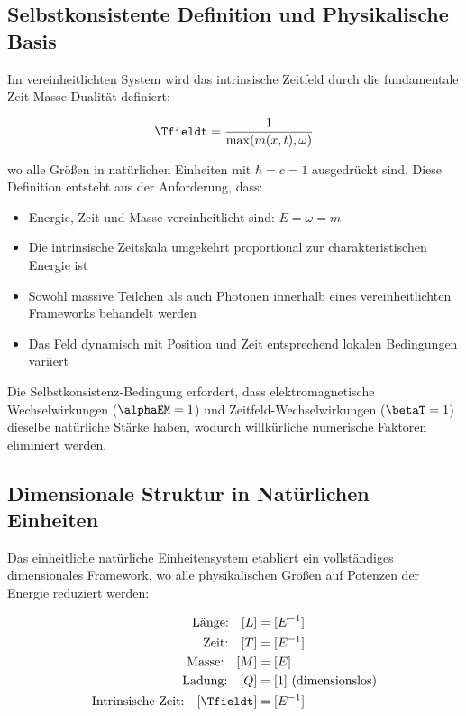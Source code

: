 	\subsection{Selbstkonsistente Definition und Physikalische Basis}
	\label{subsec:self_consistent_definition}
	
	Im vereinheitlichten System wird das intrinsische Zeitfeld durch die fundamentale Zeit-Masse-Dualität definiert:
	
	\begin{equation}
		\Tfieldt = \frac{1}{\max(m(x,t), \omega)}
	\end{equation}
	
	wo alle Größen in natürlichen Einheiten mit $\hbar = c = 1$ ausgedrückt sind. Diese Definition entsteht aus der Anforderung, dass:
	
	\begin{itemize}
		\item Energie, Zeit und Masse vereinheitlicht sind: $E = \omega = m$
		\item Die intrinsische Zeitskala umgekehrt proportional zur charakteristischen Energie ist
		\item Sowohl massive Teilchen als auch Photonen innerhalb eines vereinheitlichten Frameworks behandelt werden
		\item Das Feld dynamisch mit Position und Zeit entsprechend lokalen Bedingungen variiert
	\end{itemize}
	
	Die Selbstkonsistenz-Bedingung erfordert, dass elektromagnetische Wechselwirkungen ($\alphaEM = 1$) und Zeitfeld-Wechselwirkungen ($\betaT = 1$) dieselbe natürliche Stärke haben, wodurch willkürliche numerische Faktoren eliminiert werden.
	
	\subsection{Dimensionale Struktur in Natürlichen Einheiten}
	\label{subsec:dimensional_structure}
	
	Das einheitliche natürliche Einheitensystem etabliert ein vollständiges dimensionales Framework, wo alle physikalischen Größen auf Potenzen der Energie reduziert werden:
	
	\begin{tcolorbox}[colback=blue!5!white,colframe=blue!75!black,title=Dimensionale Struktur Einheitlicher Natürlicher Einheiten]
		\begin{align}
			\text{Länge:} \quad [L] &= [E^{-1}] \nonumber\\
			\text{Zeit:} \quad [T] &= [E^{-1}] \nonumber\\
			\text{Masse:} \quad [M] &= [E] \nonumber\\
			\text{Ladung:} \quad [Q] &= [1] \text{ (dimensionslos)} \nonumber\\
			\text{Intrinsische Zeit:} \quad [\Tfieldt] &= [E^{-1}] \nonumber
		\end{align}
	\end{tcolorbox}
	
